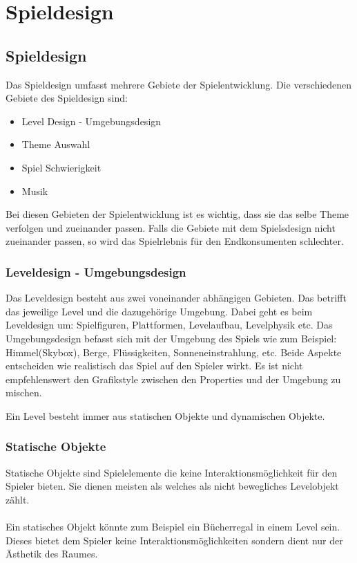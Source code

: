 \pagebreak
{}
\chapter{Spieldesign}
\section{Spieldesign} %


Das Spieldesign umfasst mehrere Gebiete der Spielentwicklung. Die verschiedenen Gebiete des Spieldesign sind:

\begin{itemize} %
    \item Level Design - Umgebungsdesign 
    \item Theme Auswahl 
    \item Spiel Schwierigkeit 
    \item Musik
\end{itemize}

Bei diesen Gebieten der Spielentwicklung ist es wichtig, dass sie das selbe Theme verfolgen und zueinander passen. Falls die Gebiete mit dem Spielsdesign nicht zueinander passen, so wird das Spielrlebnis für den Endkonsumenten schlechter. 

\subsection{Leveldesign - Umgebungsdesign}
Das Leveldesign besteht aus zwei voneinander abhängigen Gebieten. 
Das betrifft das jeweilige Level und die dazugehörige Umgebung. Dabei geht es beim Leveldesign um: Spielfiguren, Plattformen, Levelaufbau, Levelphysik etc. 
Das Umgebungsdesign befasst sich mit der Umgebung des Spiels wie zum Beispiel: Himmel(Skybox), Berge, Flüssigkeiten, Sonneneinstrahlung, etc. 
Beide Aspekte entscheiden wie realistisch das Spiel auf den Spieler wirkt. Es ist nicht empfehlenswert den Grafikstyle zwischen den Properties und der Umgebung zu mischen.

Ein Level besteht immer aus statischen Objekte und dynamischen Objekte. 

\pagebreak

\subsection{Statische Objekte}
Statische Objekte sind Spielelemente die keine Interaktionsmöglichkeit für den Spieler bieten. Sie dienen meisten als  welches als nicht bewegliches Levelobjekt zählt. \\\\
Ein statisches Objekt könnte zum Beispiel ein Bücherregal in einem Level sein. Dieses bietet dem Spieler keine Interaktionsmöglichkeiten sondern dient nur der Ästhetik des Raumes. \\

